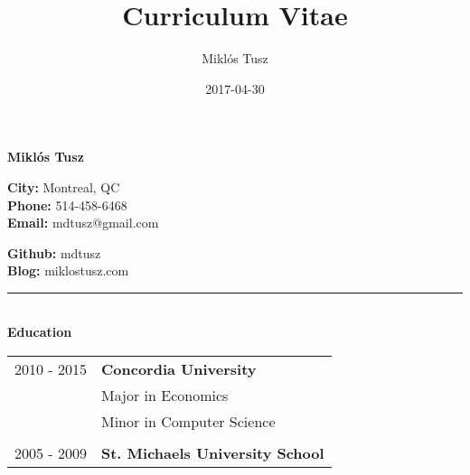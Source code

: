 \documentclass[10pt,notitlepage,oneside,draft]{article}
\title{Curriculum Vitae}
\author{Miklós Tusz}
\date{2017-04-30}
\begin{document}
\begin{flushleft}

  \Huge
  \textbf{Miklós Tusz}

  \small

  \begin{multicols}{2}

    \begin{flushleft}
      \textbf{City:} Montreal, QC \\
      \textbf{Phone:} 514-458-6468 \\
      \textbf{Email:} mdtusz@gmail.com \\
    \end{flushleft}

    \begin{flushright}
      \textbf{Github:} mdtusz \\
      \textbf{Blog:} miklostusz.com \\
    \end{flushright}

  \end{multicols}

  \rule{\textwidth}{1pt}\\[6pt]

  \large
  \textbf{Education} \\
  \vspace{12pt}
  \normalsize
  \begin{tabular}{ p{86pt} | l  }
    2010 - 2015 & \textbf{Concordia University} \\
    & Major in Economics \\
    & Minor in Computer Science \\
    & \\
    2005 - 2009 & \textbf{St. Michaels University School} \\
  \end{tabular}
  \vspace{20pt}



\end{flushleft}
\end{document}
